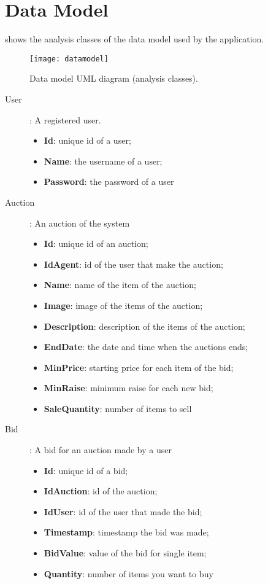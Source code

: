 \chapter{Data Model}\label{ch:datamodel}

 shows the analysis classes of the data model used by the
application.

\begin{figure}[htb]
	\texttt{[image: datamodel]}
	\caption{Data model UML diagram (analysis classes).}\label{fig:datamodel}
\end{figure}

\begin{description}
    \item [User]: A registered user.
        \begin{itemize}
            \item \textbf{Id}: unique id of a user;
            \item \textbf{Name}: the username of a user;
            \item \textbf{Password}: the password of a user
        \end{itemize}
    \item [Auction]: An auction of the system
        \begin{itemize}
            \item \textbf{Id}: unique id of an auction;
            \item \textbf{IdAgent}: id of the user that make the auction;
            \item \textbf{Name}: name of the item of the auction;
            \item \textbf{Image}: image of the items of the auction;
            \item \textbf{Description}: description of the items of the auction;
            \item \textbf{EndDate}: the date and time when the auctions ends;
            \item \textbf{MinPrice}: starting price for each item of the bid;
            \item \textbf{MinRaise}: minimum raise for each new bid;
            \item \textbf{SaleQuantity}: number of items to sell
        \end{itemize}
    \item [Bid]: A bid for an auction made by a user
        \begin{itemize}
            \item \textbf{Id}: unique id of a bid;
            \item \textbf{IdAuction}: id of the auction;
            \item \textbf{IdUser}: id of the user that made the bid;
            \item \textbf{Timestamp}: timestamp the bid was made;
            \item \textbf{BidValue}: value of the bid for single item;
            \item \textbf{Quantity}: number of items you want to buy
        \end{itemize}
\end{description}
